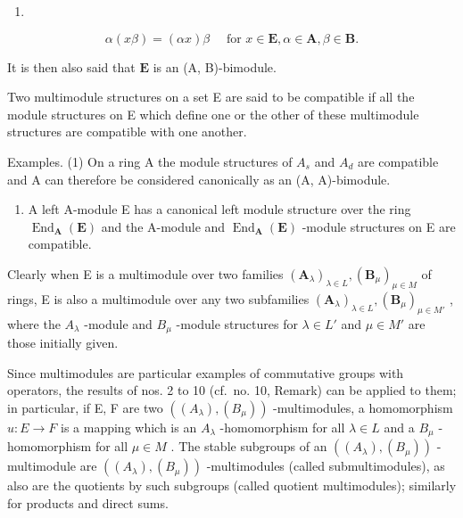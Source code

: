 \begin{enumerate}
\def\labelenumi{(\arabic{enumi})}
\setcounter{enumi}{48}
\tightlist
\item
\end{enumerate}

\[
\alpha (x \beta) = (\alpha x) \beta \quad \text { for } x \in \mathbf {E}, \alpha \in \mathbf {A}, \beta \in \mathbf {B}.
\]

It is then also said that \(\mathbf{E}\) is an (A, B)-bimodule.

Two multimodule structures on a set E are said to be compatible if all the module structures on E which define one or the other of these multimodule structures are compatible with one another.

Examples. (1) On a ring A the module structures of \(A_{s}\) and \(A_{d}\) are compatible and A can therefore be considered canonically as an (A, A)-bimodule.

\begin{enumerate}
\def\labelenumi{(\arabic{enumi})}
\setcounter{enumi}{1}
\tightlist
\item
  A left A-module E has a canonical left module structure over the ring \(\operatorname{End}_{\mathbf{A}}(\mathbf{E})\) and the A-module and \(\operatorname{End}_{\mathbf{A}}(\mathbf{E})\) -module structures on E are compatible.
\end{enumerate}

Clearly when E is a multimodule over two families \((\mathbf{A}_{\lambda})_{\lambda\in L},(\mathbf{B}_{\mu})_{\mu\in M}\) of rings, E is also a multimodule over any two subfamilies \((\mathbf{A}_{\lambda})_{\lambda\in L},(\mathbf{B}_{\mu})_{\mu\in M'}\) , where the \(A_{\lambda}\) -module and \(B_{\mu}\) -module structures for \(\lambda\in L'\) and \(\mu\in M'\) are those initially given.

Since multimodules are particular examples of commutative groups with operators, the results of nos. 2 to 10 (cf.~no. 10, Remark) can be applied to them; in particular, if E, F are two \(((A_{\lambda}), (B_{\mu}))\) -multimodules, a homomorphism \(u: E \to F\) is a mapping which is an \(A_{\lambda}\) -homomorphism for all \(\lambda \in L\) and a \(B_{\mu}\) -homomorphism for all \(\mu \in M\) . The stable subgroups of an \(((A_{\lambda}), (B_{\mu}))\) -multimodule are \(((A_{\lambda}), (B_{\mu}))\) -multimodules (called submultimodules), as also are the quotients by such subgroups (called quotient multimodules); similarly for products and direct sums.

